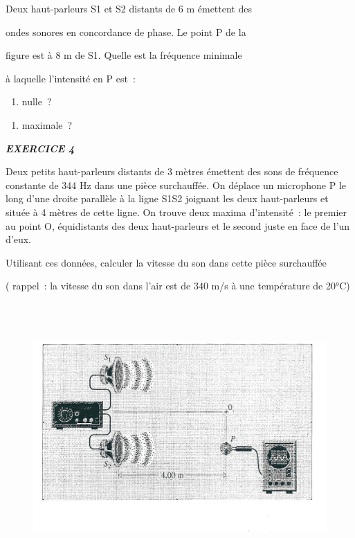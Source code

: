 Deux haut-parleurs S1 et S2 distants de 6 m émettent des

ondes sonores en concordance de phase. Le point P de la

figure est à 8 m de S1. Quelle est la fréquence minimale

à laquelle l'intensité en P est~:

\begin{enumerate}
\def\labelenumi{\alph{enumi})}
\tightlist
\item
  nulle~?
\end{enumerate}

\begin{enumerate}
\def\labelenumi{\alph{enumi})}
\tightlist
\item
  maximale~?
\end{enumerate}

\emph{\textbf{EXERCICE 4}}

Deux petits haut-parleurs distants de 3 mètres émettent des sons de
fréquence constante de 344 Hz dans une pièce surchauffée. On déplace un
microphone P le long d'une droite parallèle à la ligne S1S2 joignant les
deux haut-parleurs et située à 4 mètres de cette ligne. On trouve deux
maxima d'intensité~: le premier au point O, équidistants des deux
haut-parleurs et le second juste en face de l'un d'eux.

Utilisant ces données, calculer la vitesse du son dans cette pièce
surchauffée

( rappel~: la vitesse du son dans l'air est de 340 m/s à une température
de 20°C)

\begin{figure}
\centering
\includegraphics[width=15.663cm,height=10.231cm]{Pictures/100000010000062500000404B4675BF2C4CE1EEC.png}
\caption{}
\end{figure}

